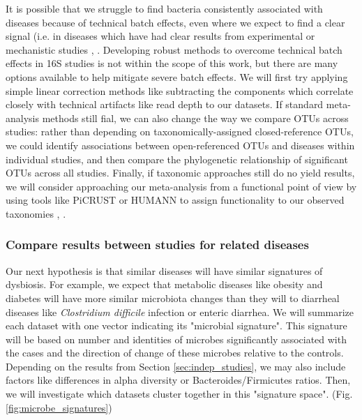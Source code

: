 \documentclass[12pt]{article}
\begin{document}
It is possible that we struggle to find bacteria consistently 
associated with diseases because of technical batch effects, even 
where we expect to find a clear signal (i.e. in diseases which have 
had clear results from experimental or mechanistic studies \cite{turnbaugh-energy_harvest-2006}, \cite{crc_zeller}. 
Developing robust methods to overcome technical batch effects in 16S 
studies is not within the scope of this work, but there are many
options available to help mitigate severe batch effects. 
We will first try applying simple linear correction methods 
like subtracting the components which correlate closely with technical 
artifacts like read depth to our datasets. 
If standard meta-analysis methods still fial, we can also 
change the way we compare OTUs across studies:
rather than depending on taxonomically-assigned closed-reference OTUs, 
we could identify associations between open-referenced OTUs and 
diseases within individual studies, and then compare 
the phylogenetic relationship of significant OTUs across all studies. Finally, 
if taxonomic approaches still do no yield results, we will consider
approaching our meta-analysis from a functional point of view by
using tools like PiCRUST or HUMANN to assign functionality to our
observed taxonomies \cite{langille-picrust-2013}, \cite{abubucker-humann-2012}.

\subsubsection{Compare results between studies for related diseases}\label{sec:signatures}
Our next hypothesis is that similar diseases will have similar 
signatures of dysbiosis. For example, we expect that metabolic 
diseases like obesity and diabetes will have more similar microbiota 
changes than they will to diarrheal diseases like \textit{Clostridium 
difficile} infection or enteric diarrhea. We will summarize each 
dataset with one vector indicating its "microbial signature". This 
signature will be based on number and identities of microbes 
significantly associated with the cases and the direction of change 
of these microbes relative to the controls. Depending on the results from Section 
\ref{sec:indep_studies}, we may also include factors like differences 
in alpha diversity or Bacteroides/Firmicutes ratios. Then, we will 
investigate which datasets cluster together in this "signature space". 
(Fig. \ref{fig:microbe_signatures})
\end{document}
